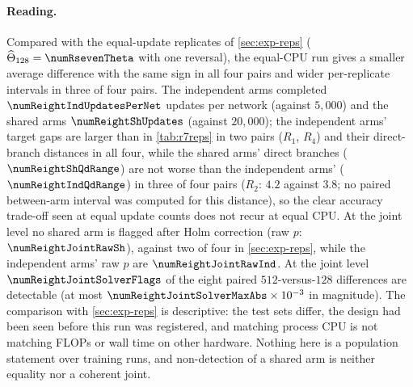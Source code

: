 \documentclass{article}
\theoremstyle{plain}
\theoremstyle{definition}
\theoremstyle{remark}
\begin{document}
\paragraph{Reading.}
Compared with the equal-update replicates of \cref{sec:exp-reps} ($\widehat\Theta_{128}=\numRsevenTheta$ with one reversal), the equal-CPU run gives a smaller average difference with the same sign in all four pairs and wider per-replicate intervals in three of four pairs. The independent arms completed $\numReightIndUpdatesPerNet$ updates per network (against $5{,}000$) and the shared arms $\numReightShUpdates$ (against $20{,}000$); the independent arms' target gaps are larger than in \cref{tab:r7reps} in two pairs ($R_1$, $R_4$) and their direct-branch distances in all four, while the shared arms' direct branches ($\numReightShQdRange$) are not worse than the independent arms' ($\numReightIndQdRange$) in three of four pairs ($R_2$: $4.2$ against $3.8$; no paired between-arm interval was computed for this distance), so the clear accuracy trade-off seen at equal update counts does not recur at equal CPU. At the joint level no shared arm is flagged after Holm correction (raw $p$: $\numReightJointRawSh$), against two of four in \cref{sec:exp-reps}, while the independent arms' raw $p$ are $\numReightJointRawInd$. At the joint level $\numReightJointSolverFlags$ of the eight paired $512$-versus-$128$ differences are detectable (at most $\numReightJointSolverMaxAbs\times10^{-3}$ in magnitude).
The comparison with \cref{sec:exp-reps} is descriptive: the test sets differ, the design had been seen before this run was registered, and matching process CPU is not matching FLOPs or wall time on other hardware. Nothing here is a population statement over training runs, and non-detection of a shared arm is neither equality nor a coherent joint.
\end{document}

